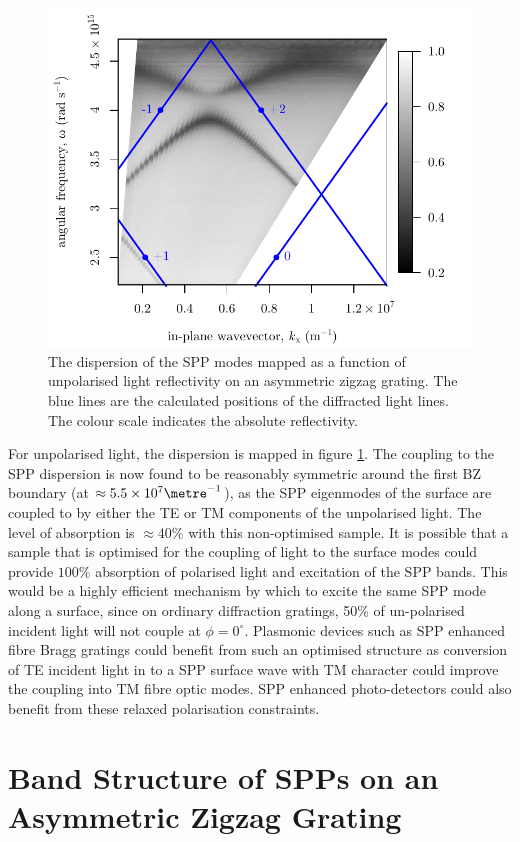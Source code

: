 \begin{figure}
\begin{center}
\includegraphics[width=0.6\linewidth]{figure-asym-zz-noPol-dispersion.pdf}
\end{center}
\caption[The dispersion of the SPP modes mapped as a function of unpolarised light reflectivity on an asymmetric zigzag grating.]{The dispersion of the SPP modes mapped as a function of unpolarised light reflectivity on an asymmetric zigzag grating. The blue lines are the calculated positions of the diffracted light lines. The colour scale indicates the absolute reflectivity.\label{fig:azz-dispersionUPOL}}
\end{figure}

For unpolarised light, the dispersion is mapped in figure \ref{fig:azz-dispersionUPOL}. The coupling to the SPP dispersion is now found to be reasonably symmetric around the first BZ boundary (at $\approx 5.5\times10^{7} \metre^{-1}$), as the SPP eigenmodes of the surface are coupled to by either the TE or TM components of the unpolarised light. The level of absorption is $\approx 40\%$ with this non-optimised sample. It is possible that a sample that is optimised for the coupling of light to the surface modes could provide $100\%$ absorption of polarised light and excitation of the SPP bands. This would be a highly efficient mechanism by which to excite the same SPP mode along a surface, since on ordinary diffraction gratings, 50\% of un-polarised incident light will not couple at $\phi=0^\circ$. Plasmonic devices such as SPP enhanced fibre Bragg gratings \cite{Epstein2012,Boltasseva2006} could benefit from such an optimised structure as conversion of TE incident light in to a SPP surface wave with TM character could improve the coupling into TM fibre optic modes. SPP enhanced photo-detectors \cite{Jestl1988} could also benefit from these relaxed polarisation constraints.

\section{Band Structure of SPPs on an Asymmetric Zigzag Grating\label{sec:asym-bandstructure}}

